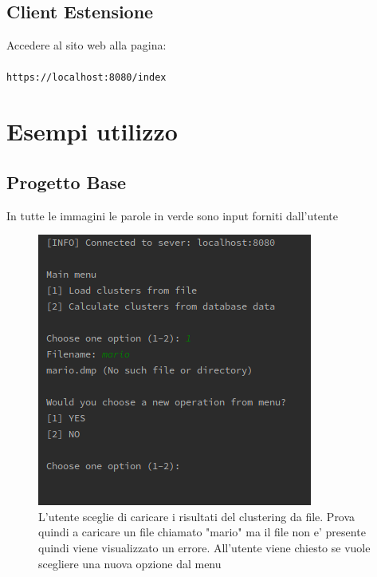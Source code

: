 \documentclass{article}
\begin{document}
            \subsection{Client Estensione}
            Accedere al sito web alla pagina: \\\\
            \verb|https://localhost:8080/index|


    \section{Esempi utilizzo}
            \subsection{Progetto Base}
    In tutte le immagini le parole in verde sono input forniti dall'utente

        \begin{figure}[!ht]
            \includegraphics{BASE1}
            \caption{L'utente sceglie di caricare i risultati del clustering 
            da file. Prova quindi a caricare un file chiamato "mario" ma il file non
            e' presente quindi viene visualizzato un errore. All'utente viene
            chiesto se vuole scegliere una nuova opzione dal menu}   
            \label{fig:1}
        \end{figure}
\end{document}
